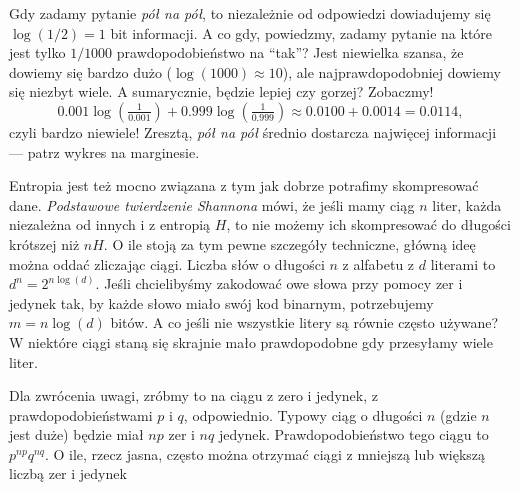 \documentclass[10pt,a4paper]{article}
\begin{document}
%
Gdy zadamy pytanie \emph{pół na pół}, to niezależnie od odpowiedzi dowiadujemy się $\log(1/2)=1$ bit informacji.
A co gdy, powiedzmy, zadamy pytanie na które jest tylko $1/1000$ prawdopodobieństwo na ``tak''?
Jest niewielka szansa, że dowiemy się bardzo dużo ($\log(1000)\approx 10$), ale najprawdopodobniej dowiemy się niezbyt wiele.
A sumarycznie, będzie lepiej czy gorzej? Zobaczmy!
%
\begin{equation}
    0.001 \log(\tfrac{1}{0.001}) + 0.999 \log(\tfrac{1}{0.999})\approx 0.0100 + 0.0014 = 0.0114,
\end{equation}
%
czyli bardzo niewiele!
Zresztą, \emph{pół na pół} średnio dostarcza najwięcej informacji --- patrz wykres na marginesie. 


Entropia jest też mocno związana z tym jak dobrze potrafimy skompresować dane.
\emph{Podstawowe twierdzenie Shannona} mówi, że jeśli mamy ciąg $n$ liter,
każda niezależna od innych i z entropią $H$, to nie możemy ich skompresować do długości krótszej niż $n H$.
O ile stoją za tym pewne szczegóły techniczne, główną ideę można oddać zliczając ciągi.
Liczba słów o długości $n$ z alfabetu z $d$ literami to $d^n=2^{n \log(d)}$.
Jeśli chcielibyśmy zakodować owe słowa przy pomocy zer i jedynek
tak, by każde słowo miało swój kod binarnym, potrzebujemy $m = n \log(d)$ bitów.
A co jeśli nie wszystkie litery są równie często używane?
W niektóre ciągi staną się skrajnie mało prawdopodobne gdy przesyłamy wiele liter.

%
Dla zwrócenia uwagi, zróbmy to na ciągu z zero i jedynek, z prawdopodobieństwami $p$ i $q$, odpowiednio.
Typowy ciąg o długości $n$ (gdzie $n$ jest duże) będzie miał $n p$ zer i $n q$ jedynek.
Prawdopodobieństwo tego ciągu to $p^{n p}q^{n q}$.
O ile, rzecz jasna, często można otrzymać ciągi z mniejszą lub większą liczbą zer i jedynek
\end{document}
